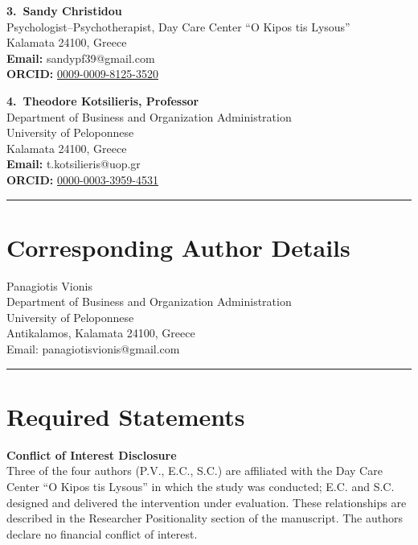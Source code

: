 \documentclass[12pt,a4paper]{article}
\begin{document}
\vspace{0.8cm}

\noindent\textbf{3.~Sandy Christidou}\\
Psychologist--Psychotherapist, Day Care Center ``O Kipos tis Lysous''\\
Kalamata 24100, Greece\\
\textbf{Email:} sandypf39@gmail.com\\
\textbf{ORCID:} \href{https://orcid.org/0009-0009-8125-3520}{0009-0009-8125-3520}

\vspace{0.8cm}

\noindent\textbf{4.~Theodore Kotsilieris, Professor}\\
Department of Business and Organization Administration\\
University of Peloponnese\\
Kalamata 24100, Greece\\
\textbf{Email:} t.kotsilieris@uop.gr\\
\textbf{ORCID:} \href{https://orcid.org/0000-0003-3959-4531}{0000-0003-3959-4531}

\vspace{1cm}

\noindent\rule{\textwidth}{0.4pt}

\section*{Corresponding Author Details}

\noindent Panagiotis Vionis\\
Department of Business and Organization Administration\\
University of Peloponnese\\
Antikalamos, Kalamata 24100, Greece\\
Email: panagiotisvionis@gmail.com

\vspace{1cm}

\noindent\rule{\textwidth}{0.4pt}

\section*{Required Statements}

\noindent\textbf{Conflict of Interest Disclosure}\\
Three of the four authors (P.V., E.C., S.C.) are affiliated with the Day Care Center
``O Kipos tis Lysous'' in which the study was conducted; E.C. and S.C. designed and
delivered the intervention under evaluation. These relationships are described in the
Researcher Positionality section of the manuscript. The authors declare no financial
conflict of interest.
\end{document}
